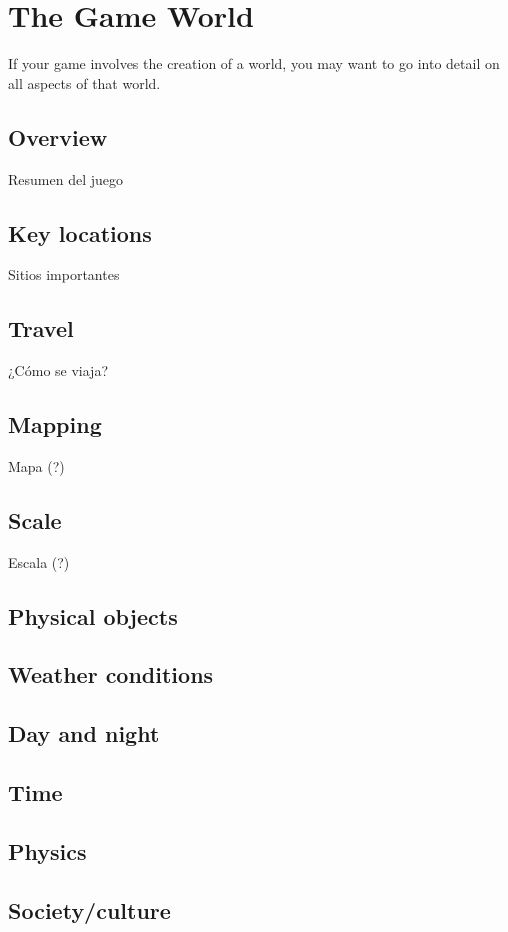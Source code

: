 \chapter{The Game World}
If your game involves the creation of a world, you may want to go into detail on all aspects of that world.
\section{Overview} %
Resumen del juego

\section{Key locations} %
Sitios importantes

\section{Travel} %
¿Cómo se viaja?

\section{Mapping} %
Mapa (?)

\section{Scale} %
Escala (?)

\section{Physical objects} %

\section{Weather conditions} %

\section{Day and night} %

\section{Time} %

\section{Physics} %

\section{Society/culture} %
